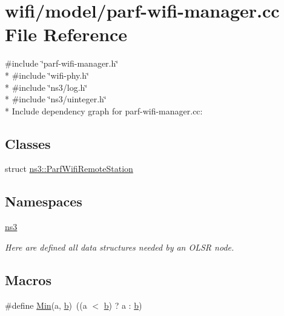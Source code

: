 \hypertarget{parf-wifi-manager_8cc}{}\section{wifi/model/parf-\/wifi-\/manager.cc File Reference}
\label{parf-wifi-manager_8cc}
{\ttfamily \#include \char`\"{}parf-\/wifi-\/manager.\+h\char`\"{}}\\*
{\ttfamily \#include \char`\"{}wifi-\/phy.\+h\char`\"{}}\\*
{\ttfamily \#include \char`\"{}ns3/log.\+h\char`\"{}}\\*
{\ttfamily \#include \char`\"{}ns3/uinteger.\+h\char`\"{}}\\*
Include dependency graph for parf-\/wifi-\/manager.cc\+:
\subsection*{Classes}
\begin{DoxyCompactItemize}
\item 
struct \hyperlink{structns3_1_1ParfWifiRemoteStation}{ns3\+::\+Parf\+Wifi\+Remote\+Station}
\end{DoxyCompactItemize}
\subsection*{Namespaces}
\begin{DoxyCompactItemize}
\item 
 \hyperlink{namespacens3}{ns3}
\begin{DoxyCompactList}\small\item\em Here are defined all data structures needed by an O\+L\+SR node. \end{DoxyCompactList}\end{DoxyCompactItemize}
\subsection*{Macros}
\begin{DoxyCompactItemize}
\item 
\#define \hyperlink{parf-wifi-manager_8cc_a9e04209162ea72f9985338596262b657}{Min}(a,  \hyperlink{lte__pathloss_8m_a21ad0bd836b90d08f4cf640b4c298e7c}{b})~((a $<$ \hyperlink{lte__pathloss_8m_a21ad0bd836b90d08f4cf640b4c298e7c}{b}) ? a \+: \hyperlink{lte__pathloss_8m_a21ad0bd836b90d08f4cf640b4c298e7c}{b})
\end{DoxyCompactItemize}
